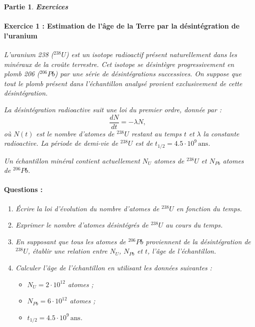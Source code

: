 \documentclass[a4paper,10pt,notitlepage,oneside]{article}
\theoremstyle{plain}
\newtheorem{partie}{\color{BlueViolet} Partie}
\begin{document}
\begin{partie} \textbf{\color{BlueViolet} Exercices}


\paragraph{\color{BlueViolet} Exercice 1 : Estimation de l'âge de la Terre par la désintégration de l'uranium}

L’uranium 238 ($^{238}U$) est un isotope radioactif présent naturellement dans les minéraux de la croûte terrestre. Cet isotope se désintègre progressivement en plomb 206 ($^{206}Pb$) par une série de désintégrations successives. On suppose que tout le plomb présent dans l’échantillon analysé provient exclusivement de cette désintégration.

La désintégration radioactive suit une loi du premier ordre, donnée par :
\[
\frac{dN}{dt} = -\lambda N,
\]
où $N(t)$ est le nombre d’atomes de $^{238}U$ restant au temps $t$ et $\lambda$ la constante radioactive. La période de demi-vie de $^{238}U$ est de $t_{1/2} = 4.5 \cdot 10^9 \, \text{ans}$.

Un échantillon minéral contient actuellement $N_{U}$ atomes de $^{238}U$ et $N_{Pb}$ atomes de $^{206}Pb$.

\paragraph{\color{BlueViolet} Questions :}
\begin{enumerate}
    \item Écrire la loi d'évolution du nombre d’atomes de $^{238}U$ en fonction du temps.
    \item Exprimer le nombre d’atomes désintégrés de $^{238}U$ au cours du temps.
    \item En supposant que tous les atomes de $^{206}Pb$ proviennent de la désintégration de $^{238}U$, établir une relation entre $N_{U}$, $N_{Pb}$ et $t$, l’âge de l’échantillon.
    \item Calculer l’âge de l’échantillon en utilisant les données suivantes :
    \begin{itemize}
        \item $N_{U} = 2 \cdot 10^{12}$ atomes ;
        \item $N_{Pb} = 6 \cdot 10^{12}$ atomes ;
        \item $t_{1/2} = 4.5 \cdot 10^9 \, \text{ans}$.
    \end{itemize}
\end{enumerate}




\end{partie}
\end{document}
